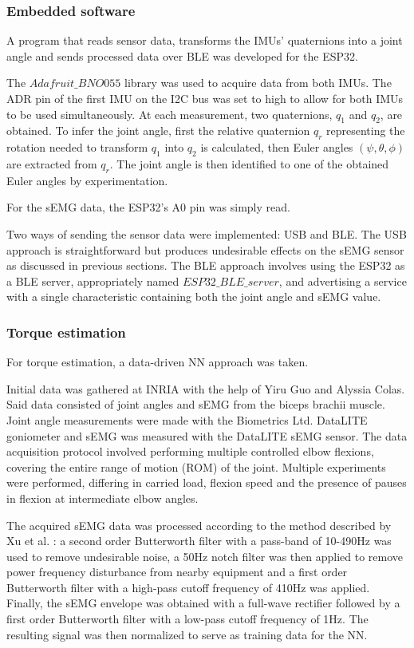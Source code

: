 \subsubsection{Embedded software}
A program that reads sensor data, transforms the IMUs' quaternions 
into a joint angle and sends processed data over BLE was developed for the 
ESP32.  

The $Adafruit\_BNO055$ library was used to acquire data from both IMUs. The ADR 
pin of the first IMU on the I2C bus was set to high to allow for both IMUs to 
be used simultaneously. At each measurement, two quaternions, $q_1$ and $q_2$, 
are obtained. To infer the joint angle, first the relative quaternion $q_r$ 
representing the rotation needed to transform $q_1$ into $q_2$ is calculated, 
then Euler angles $(\psi, \theta, \phi)$ are extracted from $q_r$. The joint 
angle is then identified to one of the obtained Euler angles by experimentation.  

For the sEMG data, the ESP32's A0 pin was simply read.  

Two ways of sending the sensor data were implemented: USB and BLE. The USB 
approach is straightforward but produces undesirable effects on the sEMG sensor 
as discussed in previous sections. The BLE approach involves using the ESP32 
as a BLE server, appropriately named $ESP32\_BLE\_server$, and advertising a 
service with a single characteristic containing both the joint angle and sEMG 
value. 
\FloatBarrier

\subsubsection{Torque estimation}
For torque estimation, a data-driven NN approach was taken.  

Initial data was gathered at INRIA with the help of Yiru Guo and Alyssia Colas. 
Said data consisted of joint angles and sEMG from the biceps brachii muscle. 
Joint angle measurements were made with the Biometrics Ltd. DataLITE goniometer 
and sEMG was measured with the DataLITE sEMG sensor. The data acquisition protocol 
involved performing multiple controlled elbow flexions, covering the entire range 
of motion (ROM) of the joint. Multiple experiments were performed, differing in 
carried load, flexion speed and the presence of pauses in flexion at intermediate 
elbow angles.  

The acquired sEMG data was processed according to the method described by Xu et al. 
\cite{wu_adaptive_2023}: a second order Butterworth filter with a pass-band of 
10-490Hz was used to remove undesirable noise, a 50Hz notch filter was then applied 
to remove power frequency disturbance from nearby equipment and a first order 
Butterworth filter with a high-pass cutoff frequency of 410Hz was applied. Finally, 
the sEMG envelope was obtained with a full-wave rectifier followed by a first order 
Butterworth filter with a low-pass cutoff frequency of 1Hz. The resulting signal 
was then normalized to serve as training data for the NN.  

